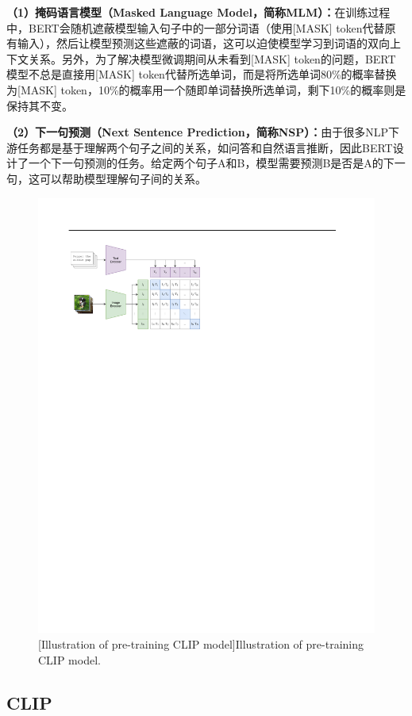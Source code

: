 \noindent \textbf{（1）掩码语言模型（Masked Language Model，简称MLM）：}在训练过程中，BERT会随机遮蔽模型输入句子中的一部分词语（使用[MASK] token代替原有输入），然后让模型预测这些遮蔽的词语，这可以迫使模型学习到词语的双向上下文关系。另外，为了解决模型微调期间从未看到[MASK] token的问题，BERT模型不总是直接用[MASK] token代替所选单词，而是将所选单词80\%的概率替换为[MASK] token，10\%的概率用一个随即单词替换所选单词，剩下10\%的概率则是保持其不变。

\noindent \textbf{（2）下一句预测（Next Sentence Prediction，简称NSP）：}由于很多NLP下游任务都是基于理解两个句子之间的关系，如问答和自然语言推断，因此BERT设计了一个下一句预测的任务。给定两个句子A和B，模型需要预测B是否是A的下一句，这可以帮助模型理解句子间的关系。

\begin{figure}[h!]
\centering
{}
\includegraphics[width=0.8\columnwidth]{figures/RelatedWork/CLIP.pdf}
[Illustration of pre-training CLIP model]{Illustration of pre-training CLIP model.}
\label{figure2: CLIP}
\end{figure}

\subsection[\hspace{-2pt}CLIP]{{\heiti{} \hspace{-8pt}CLIP}}\label{section2: CLIP}

